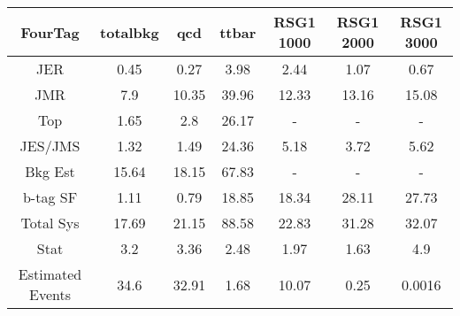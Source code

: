 \begin{footnotesize} 
\begin{tabular}{c|c|c|c|c|c|c} 
FourTag & totalbkg & qcd & ttbar & RSG1 1000 & RSG1 2000 & RSG1 3000 \\ 
\hline\hline 
JER & 0.45 & 0.27 & 3.98 & 2.44 & 1.07 & 0.67\\ 
JMR & 7.9 & 10.35 & 39.96 & 12.33 & 13.16 & 15.08\\ 
Top & 1.65 & 2.8 & 26.17 &  -  &  -  &  - \\ 
JES/JMS & 1.32 & 1.49 & 24.36 & 5.18 & 3.72 & 5.62\\ 
Bkg Est & 15.64 & 18.15 & 67.83 &  -  &  -  &  - \\ 
b-tag SF & 1.11 & 0.79 & 18.85 & 18.34 & 28.11 & 27.73\\ 
\hline 
Total Sys & 17.69 & 21.15 & 88.58 & 22.83 & 31.28 & 32.07\\ 
\hline 
Stat & 3.2 & 3.36 & 2.48 & 1.97 & 1.63 & 4.9\\ 
\hline 
Estimated Events & 34.6 & 32.91 & 1.68 & 10.07 & 0.25 & 0.0016\\ 
\hline\hline 
\end{tabular} 
\end{footnotesize} 
\newline 
